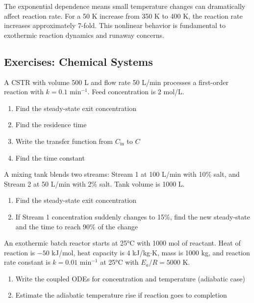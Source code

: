 

The exponential dependence means small temperature changes can dramatically affect reaction rate. For a 50 K increase from 350 K to 400 K, the reaction rate increases approximately 7-fold. This nonlinear behavior is fundamental to exothermic reaction dynamics and runaway concerns.

\subsection{Exercises: Chemical Systems}

\begin{exercise}
A CSTR with volume 500 L and flow rate 50 L/min processes a first-order reaction with $k = 0.1$ min$^{-1}$. Feed concentration is 2 mol/L.
\begin{enumerate}[label=(\alph*)]
    \item Find the steady-state exit concentration
    \item Find the residence time
    \item Write the transfer function from $C_{\text{in}}$ to $C$
    \item Find the time constant
\end{enumerate}
\end{exercise}

\begin{exercise}
A mixing tank blends two streams: Stream 1 at 100 L/min with 10\% salt, and Stream 2 at 50 L/min with 2\% salt. Tank volume is 1000 L.
\begin{enumerate}[label=(\alph*)]
    \item Find the steady-state exit concentration
    \item If Stream 1 concentration suddenly changes to 15\%, find the new steady-state and the time to reach 90\% of the change
\end{enumerate}
\end{exercise}

\begin{exercise}
An exothermic batch reactor starts at 25°C with 1000 mol of reactant. Heat of reaction is $-50$ kJ/mol, heat capacity is 4 kJ/kg$\cdot$K, mass is 1000 kg, and reaction rate constant is $k = 0.01$ min$^{-1}$ at 25°C with $E_a/R = 5000$ K.
\begin{enumerate}[label=(\alph*)]
    \item Write the coupled ODEs for concentration and temperature (adiabatic case)
    \item Estimate the adiabatic temperature rise if reaction goes to completion
\end{enumerate}
\end{exercise}

